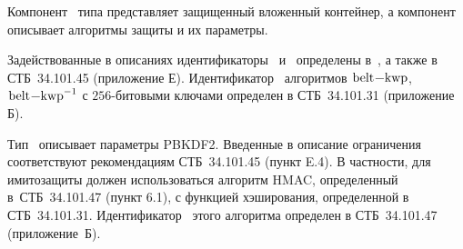 Компонент~ типа  представляет
защищенный вложенный контейнер, а компонент~ описывает
алгоритмы защиты и их параметры.

Задействованные в описаниях идентификаторы~ и~
определены в~\cite{PKCS5}, а также в СТБ~34.101.45 (приложение Е).
%
Идентификатор~ алгоритмов 
$\code{belt-kwp}$, $\code{belt-kwp}^{-1}$
с $256$-битовыми ключами определен в СТБ~34.101.31 (приложение Б).

Тип~ описывает параметры PBKDF2.
Введенные в описание ограничения соответствуют 
рекомендациям СТБ~34.101.45 (пункт E.4).
%
В частности, для имитозащиты должен использоваться алгоритм HMAC, определенный
в~СТБ~34.101.47 (пункт 6.1), с функцией хэширования, определенной в
СТБ~34.101.31. Идентификатор~ этого алгоритма определен в 
СТБ~34.101.47 (приложение~Б).

